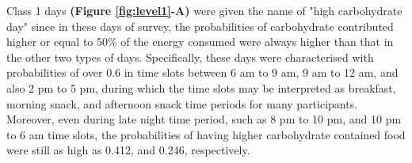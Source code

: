 


Class 1 days \textbf{(Figure \ref{fig:level1}-A)} were given the name of "high carbohydrate day" since in these days of survey, the probabilities of carbohydrate contributed higher or equal to 50\% of the energy consumed were always higher than that in the other two types of days. Specifically, these days were characterised with probabilities of over 0.6 in time slots between 6 am to 9 am, 9 am to 12 am, and also 2 pm to 5 pm, during which the time slots may be interpreted as breakfast, morning snack, and afternoon snack time periods for many participants. Moreover, even during late night time period, such as 8 pm to 10 pm, and 10 pm to 6 am time slots, the probabilities of having higher carbohydrate contained food were still as high as 0.412, and 0.246, respectively.




